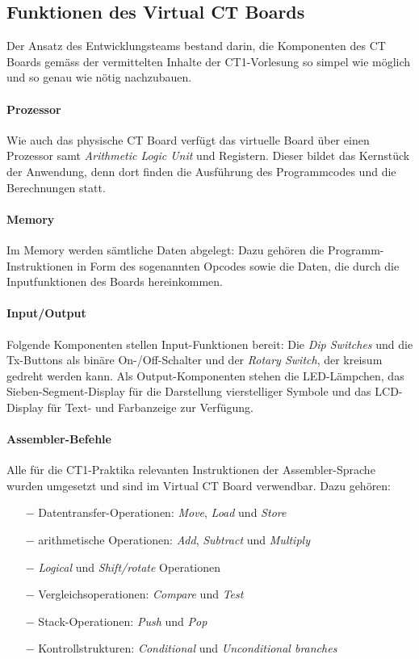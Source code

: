 \documentclass[10pt]{article}
\begin{document}

\subsection{Funktionen des \glqq Virtual CT Boards\grqq}

Der Ansatz des Entwicklungsteams bestand darin, die Komponenten des CT Boards gemäss der vermittelten Inhalte der CT1-Vorlesung so simpel wie möglich und so genau wie nötig nachzubauen.

\paragraph{Prozessor} Wie auch das physische CT Board verfügt das virtuelle Board über einen Prozessor samt \emph{Arithmetic Logic Unit} und Registern. Dieser bildet das Kernstück der Anwendung, denn dort finden die Ausführung des Programmcodes und die Berechnungen statt. 

\paragraph{Memory} Im Memory werden sämtliche Daten abgelegt: Dazu gehören die Programm-Instruktionen in Form des sogenannten Opcodes sowie die Daten, die durch die Inputfunktionen des Boards hereinkommen.

\paragraph{Input/Output} Folgende Komponenten stellen Input-Funktionen bereit: Die \emph{Dip Switches} und die Tx-Buttons als binäre On-/Off-Schalter und der \emph{Rotary Switch}, der kreisum gedreht werden kann. Als Output-Komponenten stehen die LED-Lämpchen, das Sieben-Segment-Display für die Darstellung vierstelliger Symbole und das LCD-Display für Text- und Farbanzeige zur Verfügung.

\paragraph{Assembler-Befehle} Alle für die CT1-Praktika relevanten Instruktionen der Assembler-Sprache wurden umgesetzt und sind im \glqq Virtual CT Board\grqq{} verwendbar. Dazu gehören:
\begin{itemize}
	\item[$-$] Datentransfer-Operationen: \emph{Move}, \emph{Load} und \emph{Store}
	\item[$-$] arithmetische Operationen: \emph{Add}, \emph{Subtract} und \emph{Multiply}
	\item[$-$] \emph{Logical} und \emph{Shift/rotate} Operationen
	\item[$-$] Vergleichsoperationen: \emph{Compare} und \emph{Test}
	\item[$-$] Stack-Operationen: \emph{Push} und \emph{Pop} %
	\item[$-$] Kontrollstrukturen: \emph{Conditional} und \emph{Unconditional branches}
\end{itemize}
\end{document}
